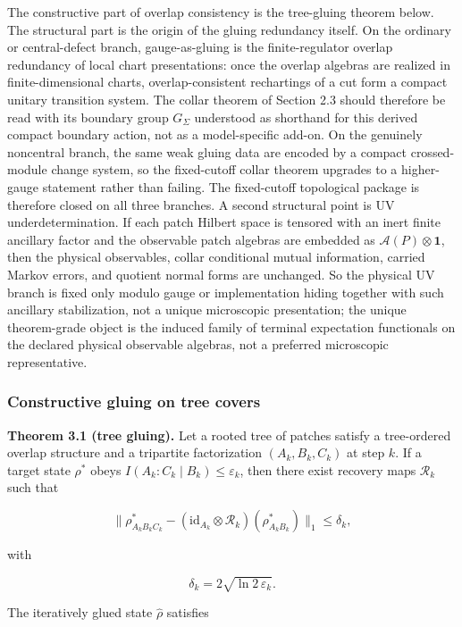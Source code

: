 The constructive part of overlap consistency is the tree-gluing theorem below. The structural part is the origin of the gluing redundancy itself. On the ordinary or central-defect branch, gauge-as-gluing is the finite-regulator overlap redundancy of local chart presentations: once the overlap algebras are realized in finite-dimensional charts, overlap-consistent rechartings of a cut form a compact unitary transition system. The collar theorem of Section 2.3 should therefore be read with its boundary group \(G_\Sigma\) understood as shorthand for this derived compact boundary action, not as a model-specific add-on. On the genuinely noncentral branch, the same weak gluing data are encoded by a compact crossed-module change system, so the fixed-cutoff collar theorem upgrades to a higher-gauge statement rather than failing. The fixed-cutoff topological package is therefore closed on all three branches.
A second structural point is UV underdetermination. If each patch Hilbert space is tensored with an inert finite ancillary factor and the observable patch algebras are embedded as \(\mathcal A(P)\otimes \mathbf 1\), then the physical observables, collar conditional mutual information, carried Markov errors, and quotient normal forms are unchanged. So the physical UV branch is fixed only modulo gauge or implementation hiding together with such ancillary stabilization, not a unique microscopic presentation; the unique theorem-grade object is the induced family of terminal expectation functionals on the declared physical observable algebras, not a preferred microscopic representative.

\subsubsection{Constructive gluing on tree covers}\label{31-constructive-gluing-on-tree-covers}

\textbf{Theorem 3.1 (tree gluing).} Let a rooted tree of patches satisfy a tree-ordered overlap structure and a tripartite factorization \((A_k, B_k, C_k)\) at step \(k\). If a target state \(\rho^{\ast}\) obeys \(I(A_k:C_k \mid B_k) \le \varepsilon_k\), then there exist recovery maps \(\mathcal{R}_k\) such that

\[
\| \rho^{\ast}_{A_k B_k C_k} - (\mathrm{id}_{A_k} \otimes \mathcal{R}_k)(\rho^{\ast}_{A_k B_k}) \|_1
\le \delta_k,
\]

with

\[
\delta_k = 2 \sqrt{\ln 2\, \varepsilon_k}.
\]

The iteratively glued state \(\hat{\rho}\) satisfies

